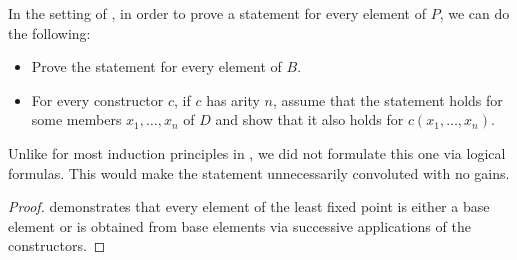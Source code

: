 \begin{theorem}\label{thm:fixed_point_recursion}\mimprovised
  In the setting of , in order to prove a statement for every element of \( P \), we can do the following:
  \begin{itemize}
    \item Prove the statement for every element of \( B \).
    \item For every constructor \( c \), if \( c \) has arity \( n \), assume that the statement holds for some members \( x_1, \ldots, x_n \) of \( D \) and show that it also holds for \( c(x_1, \ldots, x_n) \).
  \end{itemize}
\end{theorem}
\begin{comments}
  \item Unlike for most induction principles in , we did not formulate this one via logical formulas. This would make the statement unnecessarily convoluted with no gains.
\end{comments}
\begin{proof}
   demonstrates that every element of the least fixed point is either a base element or is obtained from base elements via successive applications of the constructors.
\end{proof}
